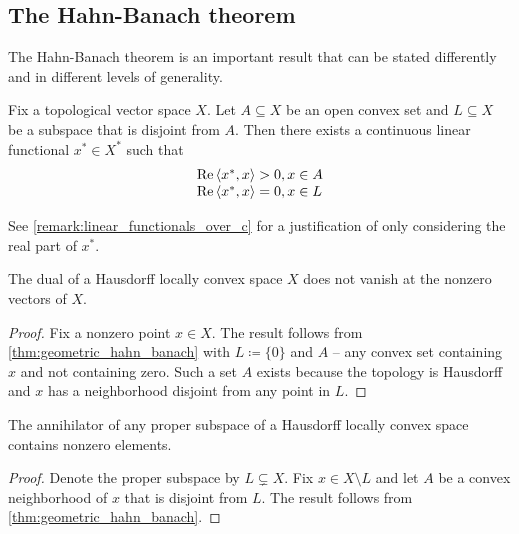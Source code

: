 \subsection{The Hahn-Banach theorem}\label{subsec:hahn_banach}

The Hahn-Banach theorem is an important result that can be stated differently and in different levels of generality.

\begin{theorem}\label{thm:geometric_hahn_banach}\cite[24]{Йоффе1974}
  Fix a topological vector space \( X \). Let \( A \subseteq X \) be an open convex set and \( L \subseteq X \) be a subspace that is disjoint from \( A \). Then there exists a continuous linear functional \( x^* \in X^* \) such that
  \begin{equation*}
    \begin{array}{l}
      \operatorname{Re} \left\langle x^*, x \right\rangle > 0, x \in A \\
      \operatorname{Re} \left\langle x^*, x \right\rangle = 0, x \in L
    \end{array}
  \end{equation*}

  See \cref{remark:linear_functionals_over_c} for a justification of only considering the real part of \( x^* \).
\end{theorem}

\begin{corollary}\label{thm:hahn_banach_implies_functionals_vanish_nowhere}\cite[24]{Йоффе1974}
  The dual of a Hausdorff locally convex space \( X \) does not vanish at the nonzero vectors of \( X \).
\end{corollary}
\begin{proof}
  Fix a nonzero point \( x \in X \). The result follows from \cref{thm:geometric_hahn_banach} with \( L \coloneqq \{ 0 \} \) and \( A \) -- any convex set containing \( x \) and not containing zero. Such a set \( A \) exists because the topology is Hausdorff and \( x \) has a neighborhood disjoint from any point in \( L \).
\end{proof}

\begin{corollary}\label{thm:hahn_banach_implies_annihilator_nontrivial}\cite[25]{Йоффе1974}
  The annihilator of any proper subspace of a Hausdorff locally convex space contains nonzero elements.
\end{corollary}
\begin{proof}
  Denote the proper subspace by \( L \subsetneq X \). Fix \( x \in X \setminus L \) and let \( A \) be a convex neighborhood of \( x \) that is disjoint from \( L \). The result follows from \cref{thm:geometric_hahn_banach}.
\end{proof}

